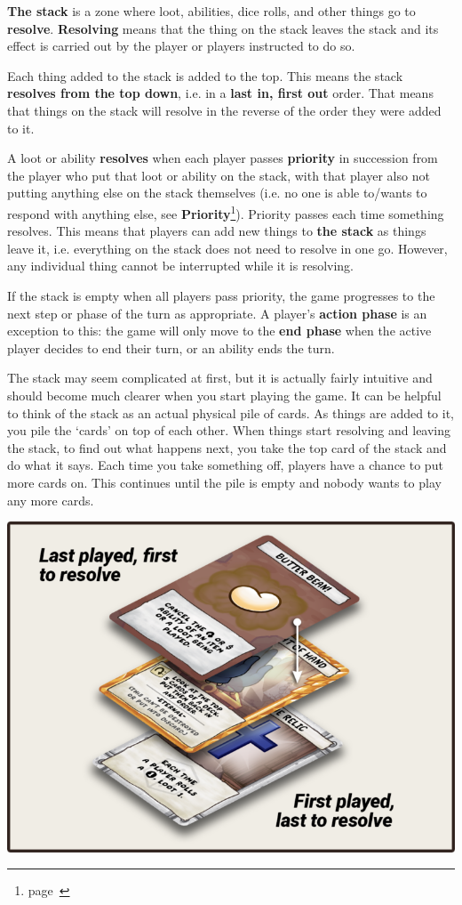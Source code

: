 \documentclass[
  fontsize=10pt,
  paper=a5,
  version=last,
  chapterprefix=true,
  bindingoffset=5mm,
  ]{scrbook}
\begin{document}
    \textbf{The stack} is a zone where loot, abilities, dice rolls, and other things go to \textbf{resolve}. \textbf{Resolving} means that the thing on the stack leaves the stack and its effect is carried out by the player or players instructed to do so.

    Each thing added to the stack is added to the top. This means the stack \textbf{resolves from the top down}, i.e. in a \textbf{last in, first out} order. That means that things on the stack will resolve in the reverse of the order they were added to it.

    A loot or ability \textbf{resolves} when each player passes \textbf{priority} in succession from the player who put that loot or ability on the stack, with that player also not putting anything else on the stack themselves (i.e. no one is able to/wants to respond with anything else, see \textbf{Priority}\footnote{page~\pageref{priority}}). Priority passes each time something resolves. This means that players can add new things to \textbf{the stack} as things leave it, i.e. everything on the stack does not need to resolve in one go. However, any individual thing cannot be interrupted while it is resolving.

    If the stack is empty when all players pass priority, the game progresses to the next step or phase of the turn as appropriate. A player’s \textbf{action phase} is an exception to this: the game will only move to the \textbf{end phase} when the active player decides to end their turn, or an ability ends the turn.

    The stack may seem complicated at first, but it is actually fairly intuitive and should become much clearer when you start playing the game. It can be helpful to think of the stack as an actual physical pile of cards. As things are added to it, you pile the ‘cards’ on top of each other. When things start resolving and leaving the stack, to find out what happens next, you take the top card of the stack and do what it says. Each time you take something off, players have a chance to put more cards on. This continues until the pile is empty and nobody wants to play any more cards.

    \includegraphics[width=\textwidth]{assets/Stack-Example-768x566.png}
    
\end{document}
